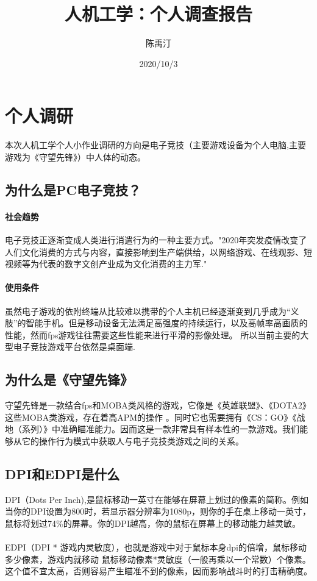 \documentclass[UTF8]{ctexart}
\title{人机工学：个人调查报告}
\author{陈禹汀}
\date{2020/10/3}
\begin{document}
\maketitle%
\newpage
\tableofcontents%
\newpage
\section{个人调研}
    本次人机工学个人小作业调研的方向是电子竞技（主要游戏设备为个人电脑,主要游戏为《守望先锋》）中人体的动态。
\subsection{为什么是PC电子竞技？}
\paragraph{社会趋势}
    电子竞技正逐渐变成人类进行消遣行为的一种主要方式。"2020年突发疫情改变了人们文化消费的方式与内容，直接影响到生产端供给，以网络游戏、在线观影、短视频等为代表的数字文创产业成为文化消费的主力军." \cite{esports}
\paragraph{使用条件}
    虽然电子游戏的依附终端从比较难以携带的个人主机已经逐渐变到几乎成为“义肢”的智能手机。但是移动设备无法满足高强度的持续运行，以及高帧率高画质的性能，然而fps游戏往往需要这些性能来进行平滑的影像处理。 \cite{framerate}所以当前主要的大型电子竞技游戏平台依然是桌面端.
\subsection{为什么是《守望先锋》}
    守望先锋是一款结合fps和MOBA类风格的游戏，它像是《英雄联盟》、《DOTA2》这些MOBA类游戏，存在着高APM的操作 \cite{wiki:APM}。同时它也需要拥有《CS：GO》《战地（系列）》中准确瞄准能力。因而这是一款非常具有样本性的一款游戏。我们能够从它的操作行为模式中获取人与电子竞技类游戏之间的关系。
\subsection{DPI和EDPI是什么}
    DPI（Dots Per Inch),是鼠标移动一英寸在能够在屏幕上划过的像素的简称。例如当你的DPI设置为800时，若显示器分辨率为1080p，则你的手在桌上移动一英寸，鼠标将划过74\%的屏幕。你的DPI越高，你的鼠标在屏幕上的移动能力越灵敏。\cite{prosetting_dpi}
\paragraph{}
    EDPI（DPI * 游戏内灵敏度），也就是游戏中对于鼠标本身dpi的倍增，鼠标移动多少像素，游戏内就移动 鼠标移动像素*灵敏度（一般再乘以一个常数）个像素。这个值不宜太高，否则容易产生瞄准不到的像素，因而影响战斗时的打击精确度。
\end{document}
